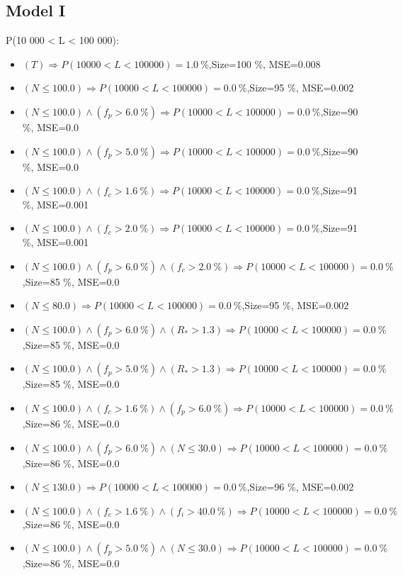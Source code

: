 \documentclass[numbered]{CSL}
\begin{document}
\subsection{Model I}
P(10 000 < L < 100 000):
\begin{itemize}
\item $(T) \Rightarrow P(10 000 < L < 100 000) = 1.0~\%$,\hfill Size=100 \%, MSE=0.008
\item $(N \leq 100.0) \Rightarrow P(10 000 < L < 100 000) = 0.0~\%$,\hfill Size=95 \%, MSE=0.002
\item $(N \leq 100.0) \land (f_p > 6.0~\%) \Rightarrow P(10 000 < L < 100 000) = 0.0~\%$,\hfill Size=90 \%, MSE=0.0
\item $(N \leq 100.0) \land (f_p > 5.0~\%) \Rightarrow P(10 000 < L < 100 000) = 0.0~\%$,\hfill Size=90 \%, MSE=0.0
\item $(N \leq 100.0) \land (f_c > 1.6~\%) \Rightarrow P(10 000 < L < 100 000) = 0.0~\%$,\hfill Size=91 \%, MSE=0.001
\item $(N \leq 100.0) \land (f_c > 2.0~\%) \Rightarrow P(10 000 < L < 100 000) = 0.0~\%$,\hfill Size=91 \%, MSE=0.001
\item $(N \leq 100.0) \land (f_p > 6.0~\%) \land (f_c > 2.0~\%) \Rightarrow P(10 000 < L < 100 000) = 0.0~\%$,\hfill Size=85 \%, MSE=0.0
\item $(N \leq 80.0) \Rightarrow P(10 000 < L < 100 000) = 0.0~\%$,\hfill Size=95 \%, MSE=0.002
\item $(N \leq 100.0) \land (f_p > 6.0~\%) \land (R_* > 1.3) \Rightarrow P(10 000 < L < 100 000) = 0.0~\%$,\hfill Size=85 \%, MSE=0.0
\item $(N \leq 100.0) \land (f_p > 5.0~\%) \land (R_* > 1.3) \Rightarrow P(10 000 < L < 100 000) = 0.0~\%$,\hfill Size=85 \%, MSE=0.0
\item $(N \leq 100.0) \land (f_c > 1.6~\%) \land (f_p > 6.0~\%) \Rightarrow P(10 000 < L < 100 000) = 0.0~\%$,\hfill Size=86 \%, MSE=0.0
\item $(N \leq 100.0) \land (f_p > 6.0~\%) \land (N \leq 30.0) \Rightarrow P(10 000 < L < 100 000) = 0.0~\%$,\hfill Size=86 \%, MSE=0.0
\item $(N \leq 130.0) \Rightarrow P(10 000 < L < 100 000) = 0.0~\%$,\hfill Size=96 \%, MSE=0.002
\item $(N \leq 100.0) \land (f_c > 1.6~\%) \land (f_i > 40.0~\%) \Rightarrow P(10 000 < L < 100 000) = 0.0~\%$,\hfill Size=86 \%, MSE=0.0
\item $(N \leq 100.0) \land (f_p > 5.0~\%) \land (N \leq 30.0) \Rightarrow P(10 000 < L < 100 000) = 0.0~\%$,\hfill Size=86 \%, MSE=0.0

\end{itemize}
\end{document}

